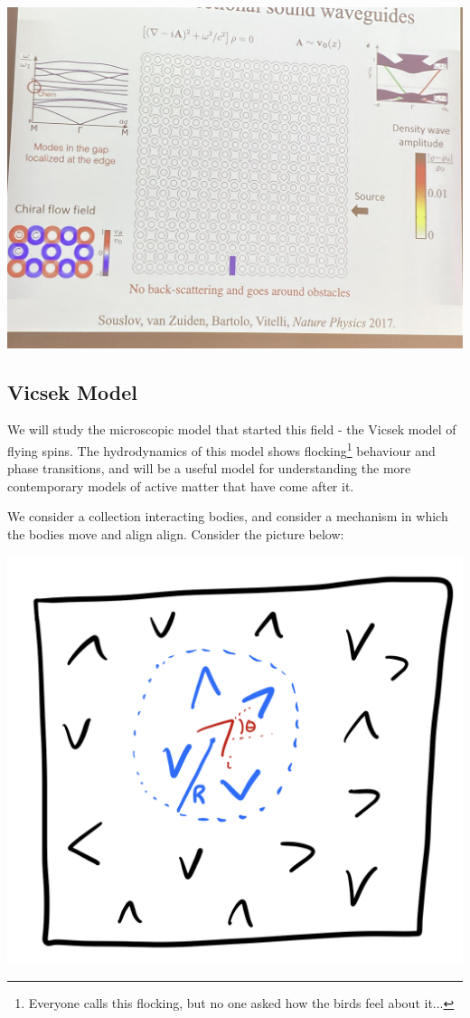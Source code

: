 \begin{center}
    \includegraphics[scale=0.35]{Lectures/Images/lec8-lattice.png}
\end{center}

\subsection{Vicsek Model}
We will study the microscopic model that started this field - the Vicsek model of flying spins. The hydrodynamics of this model shows flocking\footnote{Everyone calls this flocking, but no one asked how the birds feel about it...} behaviour and phase transitions, and will be a useful model for understanding the more contemporary models of active matter that have come after it.

We consider a collection interacting bodies, and consider a mechanism in which the bodies move and align align. Consider the picture below:

\begin{center}
    \includegraphics[scale=0.35]{Lectures/Images/lec8-Vicsek.png}
\end{center}

